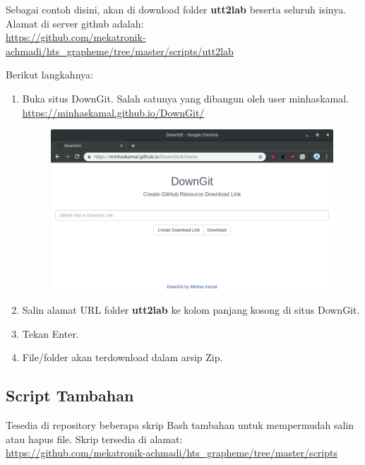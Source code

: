 \documentclass[12pt,]{article}
\begin{document}
	Sebagai contoh disini, akan di download folder \textbf{utt2lab} beserta seluruh isinya.
	Alamat di server github adalah:\\
	\url{https://github.com/mekatronik-achmadi/hts_grapheme/tree/master/scripts/utt2lab}
	
	Berikut langkahnya:
	\begin{enumerate}
		\item Buka situs DownGit.
		Salah satunya yang dibangun oleh user minhaskamal.\\
		\url{https://minhaskamal.github.io/DownGit/}
		
		\begin{figure}[!ht]
			\centering
			\includegraphics[width=450pt]{downgit.png}
		\end{figure}
		
		\item Salin alamat URL folder \textbf{utt2lab} ke kolom panjang kosong di situs DownGit.
		
		\item Tekan Enter.
		
		\item File/folder akan terdownload dalam arsip Zip.
	\end{enumerate}

	\subsection{Script Tambahan}
	
	Tesedia di repository beberapa skrip Bash tambahan untuk mempermudah salin atau hapus file.
	Skrip tersedia di alamat:\\
	\url{https://github.com/mekatronik-achmadi/hts_grapheme/tree/master/scripts}
	
\end{document}
